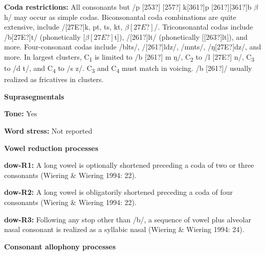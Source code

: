 \begin{styleBody}
\textbf{Coda restrictions: }All consonants but /p [253?] [257?] k[361?]p [261?][361?]b $\beta $ h/ may occur as simple codas. Biconsonantal coda combinations are quite extensive, include /[27E?]k, pt, ts, kt, $\beta [27E?]$/. Triconsonantal codas include /b[27E?]t/ (phonetically [$\beta [27E?]$t]), /[261?]lt/ (phonetically [[263?]lt]), and more. Four-consonant codas include /blts/, /[261?]ldz/, /mnts/, /ŋ[27E?]dz/, and more. In largest clusters, C\textsubscript{1} is limited to /b [261?] m ŋ/, C\textsubscript{2} to /l [27E?] n/, C\textsubscript{3} to /d t/, and C\textsubscript{4} to /s z/. C\textsubscript{3} and C\textsubscript{4} must match in voicing. /b [261?]/ usually realized as fricatives in clusters.
\end{styleBody}

\begin{styleBody}
\textbf{Suprasegmentals}
\end{styleBody}

\begin{styleBody}
\textbf{Tone:} Yes
\end{styleBody}

\begin{styleBody}
\textbf{Word stress:} Not reported
\end{styleBody}

\begin{styleBody}
\textbf{Vowel reduction processes}
\end{styleBody}

\begin{styleBody}
\textbf{dow-R1:} A long vowel is optionally shortened preceding a coda of two or three consonants (Wiering \& Wiering 1994: 22).
\end{styleBody}

\begin{styleBody}
\textbf{dow-R2:} A long vowel is obligatorily shortened preceding a coda of four consonants (Wiering \& Wiering 1994: 22).
\end{styleBody}

\begin{styleBody}
\textbf{dow-R3:} Following any stop other than /b/, a sequence of vowel plus alveolar nasal consonant is realized as a syllabic nasal (Wiering \& Wiering 1994: 24).
\end{styleBody}

\begin{styleBody}
\textbf{Consonant allophony processes}
\end{styleBody}


